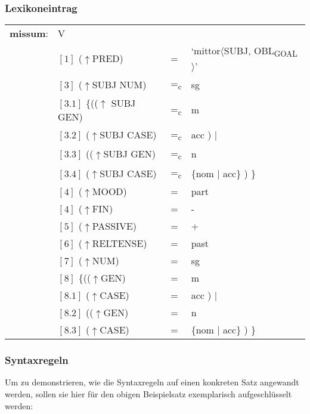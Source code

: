 \documentclass[12pt,a4paper]{article}
\begin{document}
\subsubsection{Lexikoneintrag}
\begin{singlespace}
\begin{tabular}{ l  l  l  l  } 
\textbf{missum}: & V \\
$\qquad$ & $[1]$ \:  ($\uparrow$PRED) & = & `mittor$\langle$SUBJ, OBL\textsubscript{GOAL}$\rangle$'\\
$\qquad$ & $[3]$ \:  ($\uparrow$SUBJ NUM) & =\textsubscript{c} & sg \\
$\qquad$ & $[3.1]$ \:  \{(($\uparrow$ SUBJ GEN) & =\textsubscript{c} & m \\ 
$\qquad$ & $[3.2]$ \:  ($\uparrow$SUBJ CASE) & =\textsubscript{c} & acc ) $\mid$\\
$\qquad$ & $[3.3]$ \: (($\uparrow$SUBJ GEN) & =\textsubscript{c} & n \\
$\qquad$ & $[3.4]$ \:  ($\uparrow$SUBJ CASE) & =\textsubscript{c} & \{nom $\mid$ acc\} ) \}\\
$\qquad$ & $[4]$ \:  ($\uparrow$MOOD) & = & part\\
$\qquad$ & $[4]$ \:  ($\uparrow$FIN) & = & - \\
$\qquad$ & $[5]$ \:  ($\uparrow$PASSIVE) & = & + \\
$\qquad$ & $[6]$ \:  ($\uparrow$RELTENSE) & = & past \\
$\qquad$ & $[7]$ \:  ($\uparrow$NUM) & = & sg \\
$\qquad$ & $[8]$ \:  \{(($\uparrow$GEN) & = & m \\ 
$\qquad$ & $[8.1]$ \:  ($\uparrow$CASE) & = & acc ) $\mid$\\
$\qquad$ & $[8.2]$ \: (($\uparrow$GEN) & = & n \\
$\qquad$ & $[8.3]$ \:  ($\uparrow$CASE) & = & \{nom $\mid$ acc\} ) \}\\
\end{tabular}
\newline
\newline
\end{singlespace}


\subsubsection{Syntaxregeln}
Um zu demonstrieren, wie die Syntaxregeln auf einen konkreten Satz angewandt werden, sollen sie hier für den obigen Beispielsatz exemplarisch aufgeschlüsselt werden: \\
\end{document}
